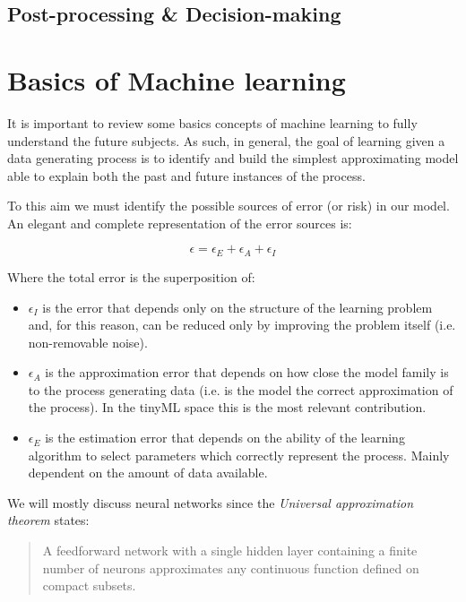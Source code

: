 \documentclass{article}
\begin{document}
    \subsection{Post-processing \& Decision-making}
  
  \newpage
  \section{Basics of Machine learning}
    It is important to review some basics concepts of machine learning to fully understand the future subjects. As such, in general, the goal of learning given a data generating process is to identify
    and build the simplest approximating model able to explain both the past and future instances of the process. 

    To this aim we must identify the possible sources of error (or risk) in our model. An elegant and complete representation of the error sources is:

    \begin{equation} 
      \epsilon = \epsilon_E + \epsilon_A + \epsilon_I
    \end{equation}

    Where the total error is the superposition of:
    \begin{itemize}
      \item $\epsilon_I$ is the error that depends only on the structure of the learning problem and, for this reason, can be reduced only by improving the problem itself (i.e. non-removable noise).
      \item $\epsilon_A$ is the approximation error that depends on how close the model family is to the process generating data (i.e. is the model the correct approximation of the process). In the tinyML space this is the most relevant contribution.
      \item $\epsilon_E$ is the estimation error that depends on the ability of the learning algorithm to select parameters which correctly represent the process. Mainly dependent on the amount of data available.
    \end{itemize}

    We will mostly discuss neural networks since the \emph{Universal approximation theorem} states: 
    \begin{quote}
      A feedforward network with a single hidden layer containing a finite number of neurons approximates any continuous function defined on compact subsets.
    \end{quote}
\end{document}
